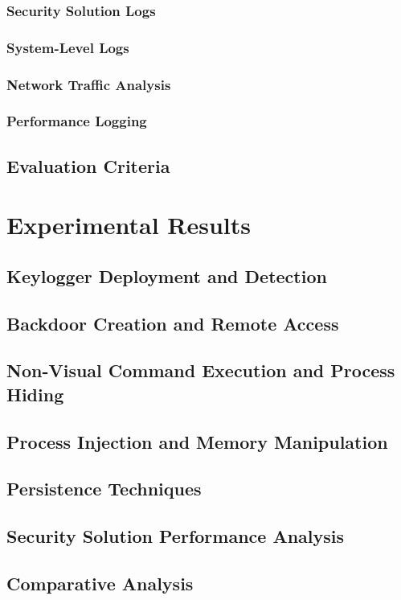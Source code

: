 \documentclass[11pt]{article}
\begin{document}
				\subsubsection{Security Solution Logs}
				\subsubsection{System-Level Logs}
				\subsubsection{Network Traffic Analysis}
				\subsubsection{Performance Logging}
			\subsection{Evaluation Criteria}

		\section{Experimental Results}
			\subsection{Keylogger Deployment and Detection}
			\subsection{Backdoor Creation and Remote Access}
			\subsection{Non-Visual Command Execution and Process Hiding}
			\subsection{Process Injection and Memory Manipulation}
			\subsection{Persistence Techniques}
			\subsection{Security Solution Performance Analysis}
			\subsection{Comparative Analysis}
			
\end{document}
